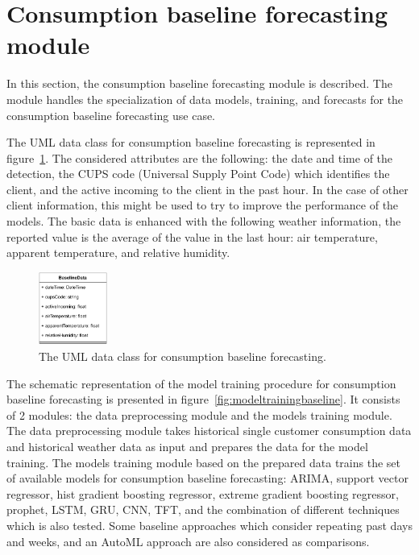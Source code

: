 \section{Consumption baseline forecasting module}
\label{sec:baselinemodel}
\vspace{0.2 cm}

In this section, the consumption baseline forecasting module is described.
The module handles the specialization of data models, training, and forecasts for the consumption baseline forecasting use case.

The UML data class for consumption baseline forecasting is represented in figure~\ref{fig:umlbaseline}.
The considered attributes are the following: the date and time of the detection, the CUPS code (Universal Supply Point Code) which identifies the client, and the active incoming to the client in the past hour.
In the case of other client information, this might be used to try to improve the performance of the models.
The basic data is enhanced with the following weather information, the reported value is the average of the value in the last hour: air temperature, apparent temperature, and relative humidity.

\begin{figure}[H]
\centering
\includegraphics[width=0.20\textwidth]{images/baseline_uml}
\caption{The UML data class for consumption baseline forecasting.}
\label{fig:umlbaseline}
\end{figure}

The schematic representation of the model training procedure for consumption baseline forecasting is presented in figure~\ref{fig:modeltrainingbaseline}.
It consists of 2 modules: the data preprocessing module and the models training module.
The data preprocessing module takes historical single customer consumption data and historical weather data as input and prepares the data for the model training.
The models training module based on the prepared data trains the set of available models for consumption baseline forecasting: ARIMA, support vector regressor, hist gradient boosting regressor, extreme gradient boosting regressor, prophet, LSTM, GRU, CNN, TFT, and the combination of different techniques which is also tested.
Some baseline approaches which consider repeating past days and weeks, and an AutoML approach are also considered as comparisons.

